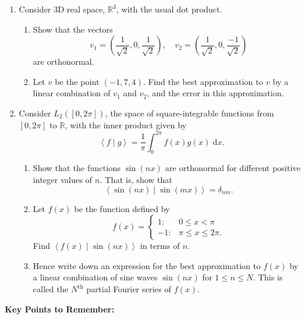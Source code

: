 \documentclass{article}
\newcommand{\diff}{\;\mathrm{d}}
\newcommand{\braket}[2]{\left\langle #1 \mid #2 \right\rangle}
\begin{document}
\begin{enumerate}
	\item Consider 3D real space, $\mathbb{R}^3$, with the usual dot product.
		\begin{enumerate}
			\item Show that the vectors
				\[v_1=\left(\frac{1}{\sqrt{2}},0,\frac{1}{\sqrt{2}}\right),\quad v_2=\left(\frac{1}{\sqrt{2}},0,\frac{-1}{\sqrt{2}}\right)\]
				are orthonormal.
			\item Let $v$ be the point $(-1,7,4)$. Find the best approximation to $v$ by a linear combination of $v_1$ and $v_2$, and the error in this approximation.
		\end{enumerate}
	\item Consider $L_2([0,2\pi])$, the space of square-integrable functions from $[0,2\pi]$ to $\mathbb{R}$, with the inner product given by
		\[\braket{f}{g}=\frac{1}{\pi}\int_0^{2\pi} f(x)g(x)\diff x.\]
		\begin{enumerate}
			\item Show that the functions $\sin(nx)$ are orthonormal for different positive integer values of $n$. That is, show that
				\[\braket{\sin(nx)}{\sin(mx)}=\delta_{nm}.\]
			\item Let $f(x)$ be the function defined by
				\[f(x)=\begin{cases} 1: & 0\leq x<\pi\\ -1: & \pi\leq x\leq 2\pi.\end{cases}\]
				Find $\braket{f(x)}{\sin(nx)}$ in terms of $n$.
			\item Hence write down an expression for the best approximation to $f(x)$ by a linear combination of sine waves $\sin(nx)$ for $1\leq n\leq N$. This is called the $N^\mathrm{th}$ partial Fourier series of $f(x)$.
		\end{enumerate}
\end{enumerate}


















\clearpage




{\bf Key Points to Remember:}

\vspace{5mm}
\end{document}
